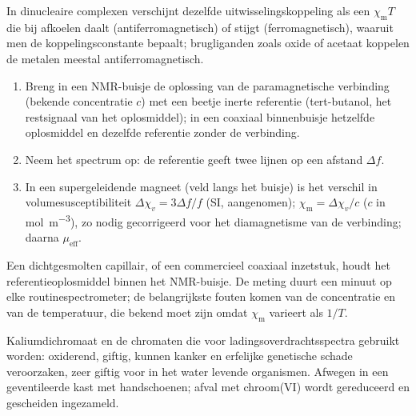 In dinucleaire complexen verschijnt dezelfde uitwisselingskoppeling als een $\chi_{\mathrm m}T$ die bij
afkoelen daalt (antiferromagnetisch) of stijgt (ferromagnetisch), waaruit
men de koppelingsconstante bepaalt; brugliganden zoals oxide of acetaat
koppelen de metalen meestal antiferromagnetisch.

\begin{method}\label{met:b3:complex-spectra-magnetism:evans}
\begin{enumerate}
  \item Breng in een NMR-buisje de oplossing van de paramagnetische
        verbinding (bekende concentratie $c$) met een beetje inerte
        referentie (tert-butanol, het restsignaal van het oplosmiddel);
        in een coaxiaal binnenbuisje hetzelfde oplosmiddel en dezelfde
        referentie zonder de verbinding.
  \item Neem het spectrum  op: de referentie geeft twee lijnen op een afstand $\Delta f$.
  \item In een supergeleidende magneet (veld langs het buisje) is het
        verschil in volumesusceptibiliteit $\Delta\chi_v = 3\Delta f/f$ (SI, aangenomen); $\chi_{\mathrm m} = \Delta\chi_v/c$ ($c$ in
        \unit{mol.m^{-3}}), zo nodig gecorrigeerd voor het diamagnetisme van
        de verbinding;
        daarna $\mu_{\mathrm{eff}}$.
\end{enumerate}
\end{method}

\begin{inthelab}
Een dichtgesmolten capillair, of een commercieel coaxiaal inzetstuk,
houdt het referentieoplosmiddel binnen het NMR-buisje. De meting duurt
een minuut op elke routinespectrometer; de belangrijkste fouten komen van
de concentratie en van de
temperatuur, die bekend moet zijn omdat $\chi_{\mathrm m}$ varieert als $1/T$.
\end{inthelab}

\begin{safety}{}
Kaliumdichromaat en de chromaten die voor ladingsoverdrachtsspectra
gebruikt worden: oxiderend, giftig, kunnen kanker en erfelijke genetische
schade veroorzaken, zeer giftig voor in het water levende organismen.
Afwegen in een geventileerde kast met handschoenen; afval met chroom(VI)
wordt gereduceerd en gescheiden ingezameld.
\end{safety}

